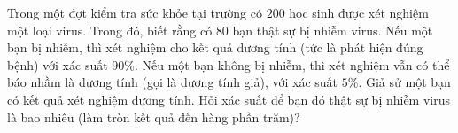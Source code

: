 \begin{bt}%
	Trong một đợt kiểm tra sức khỏe tại trường có $200$ học sinh được xét nghiệm một loại virus.  Trong đó, biết rằng có $80$ bạn thật sự bị nhiễm virus. Nếu một bạn bị nhiễm, thì xét nghiệm cho kết quả dương tính (tức là phát hiện đúng bệnh) với xác suất $90\%$. Nếu một bạn không bị nhiễm, thì xét nghiệm vẫn có thể báo nhầm là dương tính (gọi là dương tính giả), với xác suất $5\%$. Giả sử một bạn có kết quả xét nghiệm dương tính. Hỏi xác suất để bạn đó thật sự bị nhiễm virus là bao nhiêu (làm tròn kết quả đến hàng phần trăm)? 
\end{bt}

